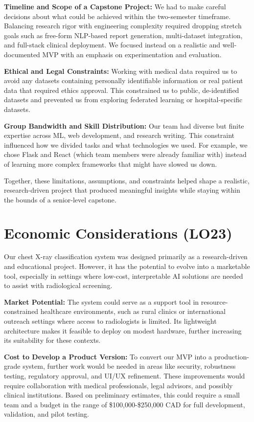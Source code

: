 \documentclass{article}
\begin{document}
\textbf{Timeline and Scope of a Capstone Project:} We had to make careful decisions about what could be achieved within the two-semester timeframe. Balancing research rigor with engineering complexity required dropping stretch goals such as free-form NLP-based report generation, multi-dataset integration, and full-stack clinical deployment. We focused instead on a realistic and well-documented MVP with an emphasis on experimentation and evaluation.

\textbf{Ethical and Legal Constraints:} Working with medical data required us to avoid any datasets containing personally identifiable information or real patient data that required ethics approval. This constrained us to public, de-identified datasets and prevented us from exploring federated learning or hospital-specific datasets.

\textbf{Group Bandwidth and Skill Distribution:} Our team had diverse but finite expertise across ML, web development, and research writing. This constraint influenced how we divided tasks and what technologies we used. For example, we chose Flask and React (which team members were already familiar with) instead of learning more complex frameworks that might have slowed us down.

\vspace{0.5em}
Together, these limitations, assumptions, and constraints helped shape a realistic, research-driven project that produced meaningful insights while staying within the bounds of a senior-level capstone.


\section{Economic Considerations (LO23)}

Our chest X-ray classification system was designed primarily as a research-driven and educational project. However, it has the potential to evolve into a marketable tool, especially in settings where low-cost, interpretable AI solutions are needed to assist with radiological screening.

\textbf{Market Potential:} The system could serve as a support tool in resource-constrained healthcare environments, such as rural clinics or international outreach settings where access to radiologists is limited. Its lightweight architecture makes it feasible to deploy on modest hardware, further increasing its suitability for these contexts.

\textbf{Cost to Develop a Product Version:} To convert our MVP into a production-grade system, further work would be needed in areas like security, robustness testing, regulatory approval, and UI/UX refinement. These improvements would require collaboration with medical professionals, legal advisors, and possibly clinical institutions. Based on preliminary estimates, this could require a small team and a budget in the range of \$100,000-\$250,000 CAD for full development, validation, and pilot testing.
\end{document}
